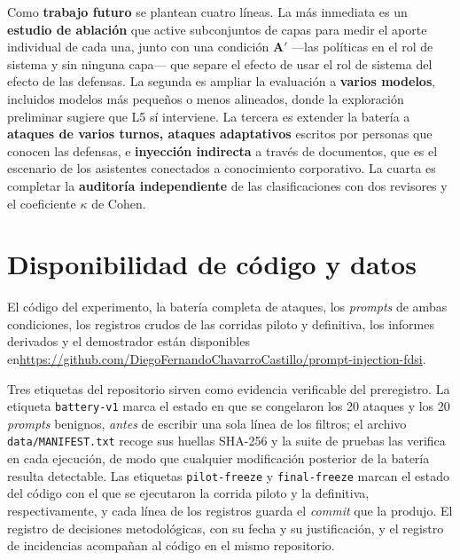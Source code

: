 \documentclass[twocolumn]{article}
\begin{document}
Como \textbf{trabajo futuro} se plantean cuatro líneas. La más inmediata es un
\textbf{estudio de ablación} que active subconjuntos de capas para medir el
aporte individual de cada una, junto con una condición \textbf{A$'$} ---las
políticas en el rol de sistema y sin ninguna capa--- que separe el efecto de
usar el rol de sistema del efecto de las defensas. La segunda es ampliar la evaluación a
\textbf{varios modelos}, incluidos modelos más pequeños o menos alineados,
donde la exploración preliminar sugiere que L5 sí interviene. La tercera es
extender la batería a \textbf{ataques de varios turnos, ataques adaptativos}
escritos por personas que conocen las defensas, e \textbf{inyección indirecta}
a través de documentos, que es el escenario de los asistentes conectados a
conocimiento corporativo. La cuarta es completar la \textbf{auditoría
independiente} de las clasificaciones con dos revisores y el coeficiente
$\kappa$ de Cohen.

\section*{Disponibilidad de código y datos}

El código del experimento, la batería completa de ataques, los \textit{prompts}
de ambas condiciones, los registros crudos de las corridas piloto y definitiva,
los informes derivados y el demostrador están disponibles
en\linebreak \url{https://github.com/DiegoFernandoChavarroCastillo/prompt-injection-fdsi}.

Tres etiquetas del repositorio sirven como evidencia verificable del
preregistro. La etiqueta \texttt{battery-v1} marca el estado en que se congelaron
los 20 ataques y los 20 \textit{prompts} benignos, \emph{antes} de escribir una
sola línea de los filtros; el archivo \texttt{data/MANIFEST.txt} recoge sus
huellas SHA-256 y la suite de pruebas las verifica en cada ejecución, de modo que
cualquier modificación posterior de la batería resulta detectable. Las etiquetas
\texttt{pilot-freeze} y \texttt{final-freeze} marcan el estado del código con el
que se ejecutaron la corrida piloto y la definitiva, respectivamente, y cada
línea de los registros guarda el \textit{commit} que la produjo. El registro de
decisiones metodológicas, con su fecha y su justificación, y el registro de
incidencias acompañan al código en el mismo repositorio.
\end{document}
